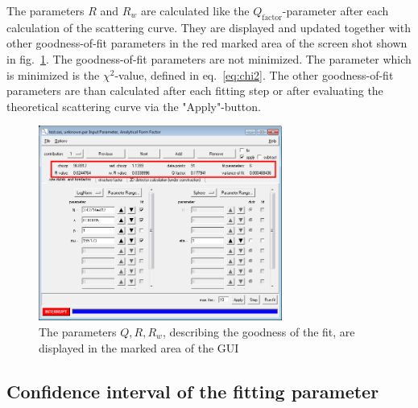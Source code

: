 \vspace{5mm}

The parameters $R$ and $R_w$ are calculated like the $Q_\text{factor}$-parameter after each calculation of the scattering curve. They are displayed and updated together with other goodness-of-fit parameters in the red marked area of the screen shot shown in fig.\ \ref{fig:GoodnessParGUI}. The goodness-of-fit parameters are not minimized. The parameter which is minimized is the $\chi^2$-value, defined in eq.\ \ref{eq:chi2}. The other goodness-of-fit parameters are than calculated after each fitting step or after evaluating the theoretical scattering curve via the "Apply"-button.

\begin{figure}[htb]
\begin{center}
\includegraphics[width=0.712\textwidth]{../images/related_pages/goodnessOFfitPAR.png}
\end{center}
\caption{The parameters $Q, R,R_w$, describing the goodness of the fit, are displayed in the marked area of the GUI}
\label{fig:GoodnessParGUI}
\end{figure}

\subsection{Confidence interval of the fitting parameter}
~\\

